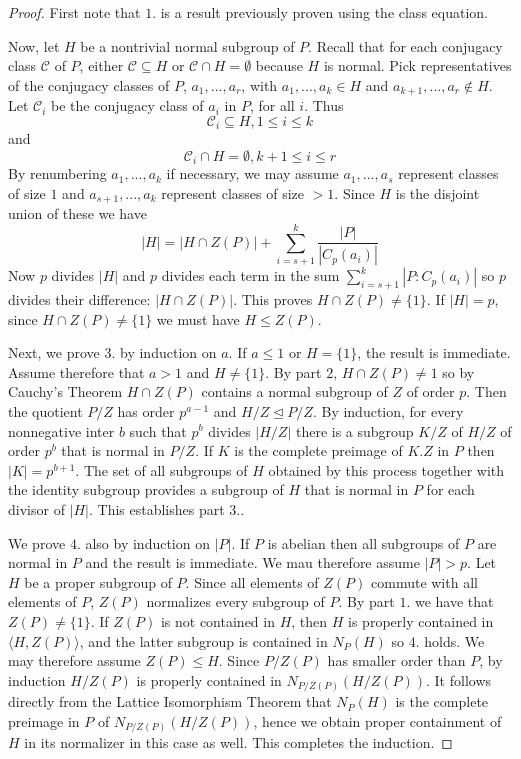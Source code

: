 \documentclass[12pt, a4paper, oneside, openright, titlepage]{book}
\begin{document}
\begin{proof}
    First note that $1.$ is a result previously proven using the class equation.

    Now, let $H$ be a nontrivial normal subgroup of $P$. Recall that for each conjugacy class $\mathcal{C}$ of $P$, either $\mathcal{C} \subseteq H$ or $\mathcal{C} \cap H = \emptyset$ because $H$ is normal. Pick representatives of the conjugacy classes of $P$, $a_1,...,a_r$, with $a_1,...,a_k \in H$ and $a_{k+1},...,a_r \notin H$. Let $\mathcal{C}_i$ be the conjugacy class of $a_i$ in $P$, for all $i$. Thus \begin{equation*}
        \mathcal{C}_i \subseteq H, 1 \leq i \leq k
    \end{equation*}
    and \begin{equation*}
        \mathcal{C}_i\cap H = \emptyset, k+1\leq i \leq r
    \end{equation*}
    By renumbering $a_1,...,a_k$ if necessary, we may assume $a_1,...,a_s$ represent classes of size $1$ and $a_{s+1},...,a_k$ represent classes of size $> 1$. Since $H$ is the disjoint union of these we have \begin{equation*}
        |H| = |H\cap Z(P)| + \sum\limits_{i=s+1}^k\frac{|P|}{|C_p(a_i)|}
    \end{equation*}
    Now $p$ divides $|H|$ and $p$ divides each term in the sum $\sum_{i=s+1}^k|P:C_p(a_i)|$ so $p$ divides their difference: $|H\cap Z(P)|$. This proves $H\cap Z(P) \neq \{1\}$. If $|H| = p$, since $H\cap Z(P) \neq \{1\}$ we must have $H \leq Z(P)$. 

    Next, we prove $3.$ by induction on $a$. If $a \leq 1$ or $H = \{1\}$, the result is immediate. Assume therefore that $a > 1$ and $H \neq \{1\}$. By part $2$, $H\cap Z(P) \neq 1$ so by Cauchy's Theorem $H\cap Z(P)$ contains a normal subgroup of $Z$ of order $p$. Then the quotient $P/Z$ has order $p^{a-1}$ and $H/Z\trianglelefteq P/Z$. By induction, for every nonnegative inter $b$ such that $p^b$ divides $|H/Z|$ there is a subgroup $K/Z$ of $H/Z$ of order $p^b$ that is normal in $P/Z$. If $K$ is the complete preimage of $K.Z$ in $P$ then $|K| = p^{b+1}$. The set of all subgroups of $H$ obtained by this process together with the identity subgroup provides a subgroup of $H$ that is normal in $P$ for each divisor of $|H|$. This establishes part $3.$.

    We prove $4.$ also by induction on $|P|$. If $P$ is abelian then all subgroups of $P$ are normal in $P$ and the result is immediate. We mau therefore assume $|P| > p$. Let $H$ be a proper subgroup of $P$. Since all elements of $Z(P)$ commute with all elements of $P$, $Z(P)$ normalizes every subgroup of $P$. By part $1.$ we have that $Z(P) \neq \{1\}$. If $Z(P)$ is not contained in $H$, then $H$ is properly contained in $\langle H,Z(P)\rangle$, and the latter subgroup is contained in $N_P(H)$ so $4.$ holds. We may therefore assume $Z(P) \leq H$. Since $P/Z(P)$ has smaller order than $P$, by induction $H/Z(P)$ is properly contained in $N_{P/Z(P)}(H/Z(P))$. It follows directly from the Lattice Isomorphism Theorem that $N_P(H)$ is the complete preimage in $P$ of $N_{P/Z(P)}(H/Z(P))$, hence we obtain proper containment of $H$ in its normalizer in this case as well. This completes the induction.


\end{proof}
\end{document}
